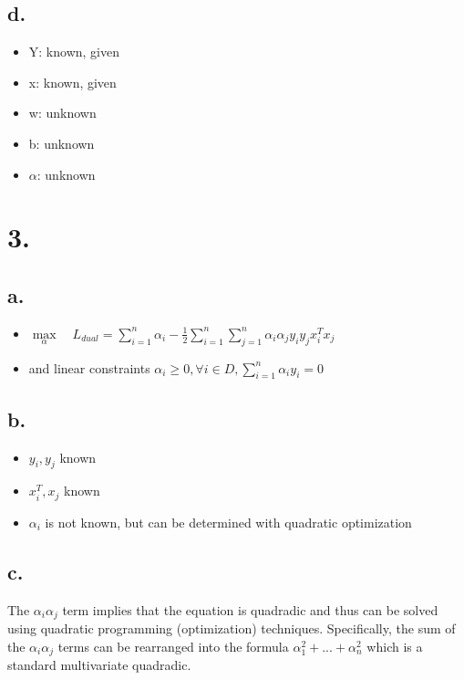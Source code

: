 \documentclass[11pt]{article}
\begin{document}
\subsection*{d.}
\label{sec:orga140517}
\begin{itemize}
\item Y: known, given
\item x: known, given
\item w: unknown
\item b: unknown
\item \(\alpha\): unknown
\end{itemize}
\section*{3.}
\label{sec:org46662e1}
\subsection*{a.}
\label{sec:orgdc3ba91}
\begin{itemize}
\item \(\underset{\alpha}\max \quad L_{dual} = \displaystyle \sum\limits^n_{i=1}\alpha_i -
  \frac{1}{2}\displaystyle \sum\limits^n_{i=1}\displaystyle \sum\limits^n_{j=1}\alpha_i\alpha_jy_iy_jx^T_ix_j\)
\item and linear constraints \(\alpha_i \ge 0, \forall i \in D, \displaystyle \sum \limits^n_{i=1} \alpha_i
  y_i = 0\)
\end{itemize}
\subsection*{b.}
\label{sec:orge028861}
\begin{itemize}
\item \(y_i, y_j\) known
\item \(x_i^T, x_j\) known
\item \(\alpha_i\) is not known, but can be determined with quadratic optimization
\end{itemize}
\subsection*{c.}
\label{sec:orgb05e89f}
The \(\alpha_i\alpha_j\) term implies that the equation is quadradic and thus can be
solved using quadratic programming (optimization) techniques. Specifically, the
sum of the \(\alpha_i\alpha_j\) terms can be rearranged into the formula \(\alpha_1^2 + ... +
\alpha_n^2\) which is a standard multivariate quadradic.
\end{document}
